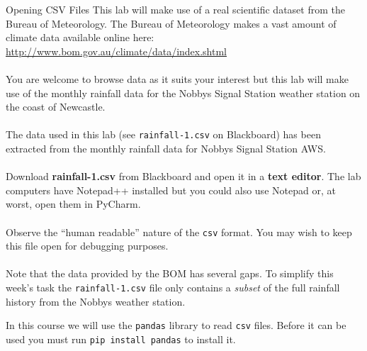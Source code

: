 \documentclass{lab}
\begin{document}
\begin{task}{Opening CSV Files}{}
This lab will make use of a real scientific dataset from the Bureau of Meteorology. The Bureau of Meteorology makes a vast amount of climate data available online here: \url{http://www.bom.gov.au/climate/data/index.shtml}
\\~\\
You are welcome to browse data as it suits your interest but this lab will make use of the monthly rainfall data for the Nobbys Signal Station weather station on the coast of Newcastle.
\\~\\
The data used in this lab (see \texttt{rainfall-1.csv} on Blackboard) has been extracted from the monthly rainfall data for Nobbys Signal Station AWS.
\\~\\
Download \textbf{rainfall-1.csv} from Blackboard and open it in a \textbf{text editor}. The lab computers have Notepad++ installed but you could also use Notepad or, at worst, open them in PyCharm.
\\~\\
Observe the ``human readable'' nature of the \texttt{csv} format. You may wish to keep this file open for debugging purposes.
\\~\\
Note that the data provided by the BOM has several gaps. To simplify this week's task the \texttt{rainfall-1.csv} file only contains a \textit{subset} of the full rainfall history from the Nobbys weather station.
\end{task}

In this course we will use the \texttt{pandas} library to read \texttt{csv} files. Before it can be used you must run \texttt{pip install pandas} to install it.
\end{document}
